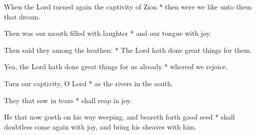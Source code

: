 \begin{multicols}{2}
	
	When the Lord turned again the captivity of Zion * then were we like unto them that dream.
	
	Then was our mouth filled with laughter * and our tongue with joy.
	
	Then said they among the heathen: * The Lord hath done great things for them.
	
	Yea, the Lord hath done great things for us already * whereof we rejoice.
	
	Turn our captivity, O Lord * as the rivers in the south.
	
	They that sow in tears * shall reap in joy.
	
	He that now goeth on his way weeping, and beareth forth good seed * shall doubtless come again with joy, and bring his sheaves with him.
	
	\gloria{}
\end{multicols}